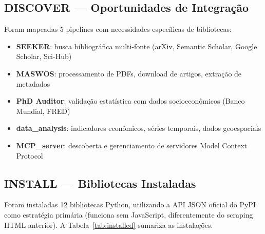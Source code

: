 \documentclass[12pt,a4paper]{article}
\begin{document}
\subsection{DISCOVER — Oportunidades de Integração}

Foram mapeadas 5 pipelines com necessidades específicas de bibliotecas:

\begin{itemize}
  \item \textbf{SEEKER}: busca bibliográfica multi-fonte (arXiv, Semantic Scholar, Google Scholar, Sci-Hub)
  \item \textbf{MASWOS}: processamento de PDFs, download de artigos, extração de metadados
  \item \textbf{PhD Auditor}: validação estatística com dados socioeconômicos (Banco Mundial, FRED)
  \item \textbf{data\_analysis}: indicadores econômicos, séries temporais, dados geoespaciais
  \item \textbf{MCP\_server}: descoberta e gerenciamento de servidores Model Context Protocol
\end{itemize}

\subsection{INSTALL — Bibliotecas Instaladas}

Foram instaladas 12 bibliotecas Python, utilizando a API JSON oficial do PyPI como estratégia primária (funciona sem JavaScript, diferentemente do scraping HTML anterior). A Tabela~\ref{tab:installed} sumariza as instalações.
\end{document}
